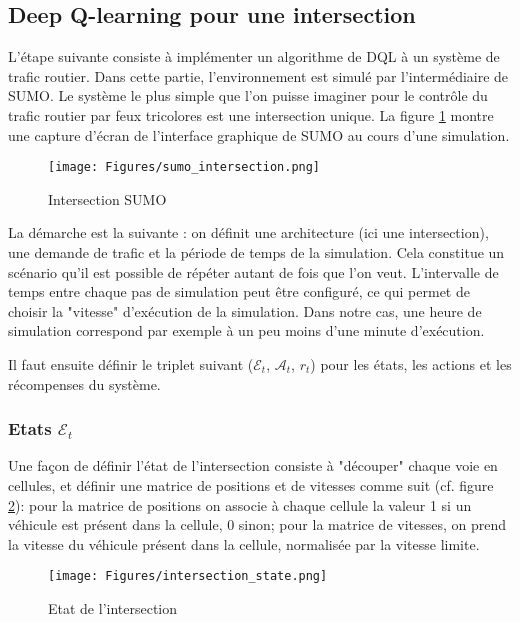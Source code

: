 \documentclass[11pt]{article}
\begin{document}
\subsection{Deep Q-learning pour une intersection}
\label{sec:org3478b02}

L'étape suivante consiste à implémenter un algorithme de DQL à un système de trafic routier. Dans cette partie, l'environnement est simulé par l'intermédiaire de SUMO. Le système le plus simple que l'on puisse imaginer pour le contrôle du trafic routier par feux tricolores est une intersection unique. La figure \ref{fig:sumo-intersection} montre une capture d'écran de l'interface graphique de SUMO au cours d'une simulation.


\begin{figure}[ht]
\centering
\texttt{[image: Figures/sumo\_intersection.png]}
\caption[sumo-intersection]{Intersection SUMO}
\label{fig:sumo-intersection}
\end{figure}

La démarche est la suivante : on définit une architecture (ici une intersection), une demande de trafic et la période de temps de la simulation. Cela constitue un scénario qu'il est possible de répéter autant de fois que l'on veut. L'intervalle de temps entre chaque pas de simulation peut être configuré, ce qui permet de choisir la "vitesse" d'exécution de la simulation. Dans notre cas, une heure de simulation correspond par exemple à un peu moins d'une minute d'exécution.


Il faut ensuite définir le triplet suivant (\(\mathcal{E}_t\), \(\mathcal{A}_t\), \(r_t\)) pour les états, les actions  et les récompenses du système.


\subsubsection{Etats \(\mathcal{E}_t\)}
\label{sec:org662367b}

Une façon de définir l'état de l'intersection consiste à "découper" chaque voie en cellules, et définir une matrice de positions et de vitesses comme suit (cf. figure \ref{fig:intersection-state}): pour la matrice de positions on associe à chaque cellule la valeur 1 si un véhicule est présent dans la cellule, 0 sinon; pour la matrice de vitesses, on prend la vitesse du véhicule présent dans la cellule, normalisée par la vitesse limite.

\begin{figure}[ht]
\centering
\texttt{[image: Figures/intersection\_state.png]}
\caption[intersection-state]{Etat de l'intersection}
\label{fig:intersection-state}
\end{figure}
\end{document}
